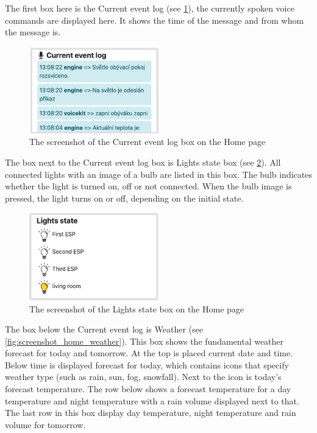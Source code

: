The first box here is the Current event log (see \cref{fig:screenshot_home_current_event_log}), the currently spoken voice commands are displayed here. It shows the time of the message and from whom the message is. 

\begin{figure}[H]
    \centering
    \includegraphics[width=0.5\textwidth]{img/screenshot_home_current_event_log.png}
    \caption{The screenshot of the Current event log box on the Home page}
    \label{fig:screenshot_home_current_event_log}
\end{figure}

The box next to the Current event log box is Lights state box (see \cref{fig:screenshot_home_lights_state}). All connected lights with an image of a bulb are listed in this box. The bulb indicates whether the light is turned on, off or not connected. When the bulb image is pressed, the light turns on or off, depending on the initial state.

\begin{figure}[H]
    \centering
    \includegraphics[width=0.5\textwidth]{img/screenshot_home_lights_state.png}
    \caption{The screenshot of the Lights state box on the Home page}
    \label{fig:screenshot_home_lights_state}
\end{figure}

The box below the Current event log is Weather (see \cref{fig:screenshot_home_weather}). This box shows the fundamental weather forecast for today and tomorrow. At the top is placed current date and time. Below time is displayed forecast for today, which contains icons that specify weather type (such as rain, sun, fog, snowfall). Next to the icon is today's forecast temperature. The row below shows a forecast temperature for a day temperature and night temperature with a rain volume displayed next to that. The last row in this box display day temperature, night temperature and rain volume for tomorrow.

